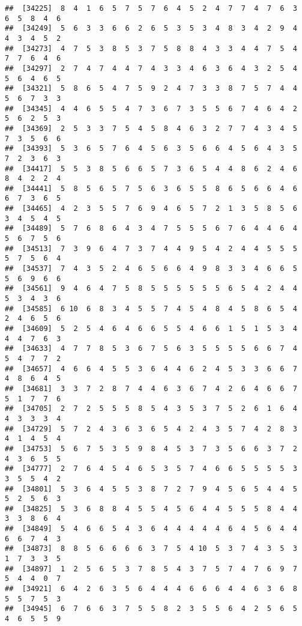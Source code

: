 \documentclass[
]{book}
\begin{document}
\begin{verbatim}
##  [34225]  8  4  1  6  5  7  5  7  6  4  5  2  4  7  7  4  7  6  3  6  5  8  4  6
##  [34249]  5  6  3  3  6  6  2  6  5  3  5  3  4  8  3  4  2  9  4  4  3  4  5  2
##  [34273]  4  7  5  3  8  5  3  7  5  8  8  4  3  3  4  4  7  5  4  7  7  6  4  6
##  [34297]  2  7  4  7  4  4  7  4  3  3  4  6  3  6  4  3  2  5  4  5  6  4  6  5
##  [34321]  5  8  6  5  4  7  5  9  2  4  7  3  3  8  7  5  7  4  4  5  6  7  3  3
##  [34345]  4  4  6  5  5  4  7  3  6  7  3  5  5  6  7  4  6  4  2  5  6  2  5  3
##  [34369]  2  5  3  3  7  5  4  5  8  4  6  3  2  7  7  4  3  4  5  7  3  5  6  6
##  [34393]  5  3  6  5  7  6  4  5  6  3  5  6  6  4  5  6  4  3  5  7  2  3  6  3
##  [34417]  5  5  3  8  5  6  6  5  7  3  6  5  4  4  8  6  2  4  6  8  4  2  2  4
##  [34441]  5  8  5  6  5  7  5  6  3  6  5  5  8  6  5  6  6  4  6  6  7  3  6  5
##  [34465]  4  2  3  5  5  7  6  9  4  6  5  7  2  1  3  5  8  5  6  3  4  5  4  5
##  [34489]  5  7  6  8  6  4  3  4  7  5  5  5  6  7  6  4  4  6  4  5  6  7  5  6
##  [34513]  7  3  9  6  4  7  3  7  4  4  9  5  4  2  4  4  5  5  5  5  7  5  6  4
##  [34537]  7  4  3  5  2  4  6  5  6  6  4  9  8  3  3  4  6  6  5  5  6  9  6  6
##  [34561]  9  4  6  4  7  5  8  5  5  5  5  5  5  6  5  4  2  4  4  5  3  4  3  6
##  [34585]  6 10  6  8  3  4  5  5  7  4  5  4  8  4  5  8  6  5  4  2  4  6  5  6
##  [34609]  5  2  5  4  6  4  6  6  5  5  4  6  6  1  5  1  5  3  4  4  4  7  6  3
##  [34633]  4  7  7  8  5  3  6  7  5  6  3  5  5  5  5  6  6  7  4  5  4  7  7  2
##  [34657]  4  6  6  4  5  5  3  6  4  4  6  2  4  5  3  3  6  6  7  4  8  6  4  5
##  [34681]  3  3  7  2  8  7  4  4  6  3  6  7  4  2  6  4  6  6  7  5  1  7  7  6
##  [34705]  2  7  2  5  5  5  8  5  4  3  5  3  7  5  2  6  1  6  4  4  3  3  3  4
##  [34729]  5  7  2  4  3  6  3  6  5  4  2  4  3  5  7  4  2  8  3  4  1  4  5  4
##  [34753]  5  6  7  5  3  5  9  8  4  5  3  7  3  5  6  6  3  7  2  4  3  6  5  5
##  [34777]  2  7  6  4  5  4  6  5  3  5  7  4  6  6  5  5  5  5  3  3  5  5  4  2
##  [34801]  5  3  6  4  5  5  3  8  7  2  7  9  4  5  6  5  4  4  5  5  2  5  6  3
##  [34825]  5  3  6  8  8  4  5  5  4  5  6  4  4  5  5  5  8  4  4  3  3  8  6  4
##  [34849]  5  4  6  6  5  4  3  6  4  4  4  4  4  6  4  5  6  4  4  6  6  7  4  3
##  [34873]  8  8  5  6  6  6  6  3  7  5  4 10  5  3  7  4  3  5  3  1  7  3  3  5
##  [34897]  1  2  5  6  5  3  7  8  5  4  3  7  5  7  4  7  6  9  7  5  4  4  0  7
##  [34921]  6  4  2  6  3  5  6  4  4  4  6  6  6  4  4  6  3  6  8  5  5  7  5  3
##  [34945]  6  7  6  6  3  7  5  5  8  2  3  5  5  6  4  2  5  6  5  4  6  5  5  9

\end{verbatim}
\end{document}
